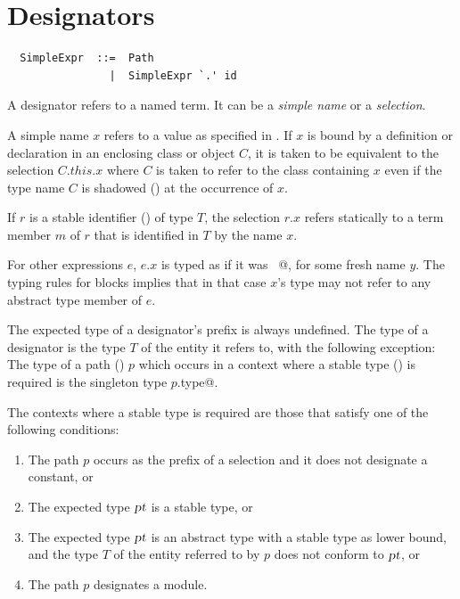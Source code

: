 \section{Designators}
\label{sec:designators}

\syntax\begin{lstlisting}
  SimpleExpr  ::=  Path
                |  SimpleExpr `.' id
\end{lstlisting}

A designator refers to a named term. It can be a {\em simple name} or
a {\em selection}. 

A simple name $x$ refers to a value as specified in .
If $x$ is bound by a definition or declaration in an enclosing class
or object $C$, it is taken to be equivalent to the selection
$C.this.x$ where $C$ is taken to refer to the class containing $x$
even if the type name $C$ is shadowed () at the
occurrence of $x$.

If $r$ is a stable identifier
() of type $T$, the selection $r.x$ refers
statically to a term member $m$ of $r$ that is identified in $T$ by
the name $x$.   

For other expressions $e$, $e.x$ is typed as
if it was ~@, for some fresh name
$y$.  The typing rules for blocks implies that in that case $x$'s type
may not refer to any abstract type member of $e$.

The expected type of a designator's prefix is always undefined.  The
type of a designator is the type $T$ of the entity it refers to, with the
following exception: The type of a path () $p$ which
occurs in a context where a stable type () is required is the
singleton type \lstinline@$p$.type@.

The contexts where a stable type is required are those that satisfy
one of the following conditions:
\begin{enumerate}
\item
The path $p$ occurs as the prefix of a selection and it does not
designate a constant, or
\item
The expected type $\mbox{\sl pt}$ is a stable type, or
\item
The expected type $\mbox{\sl pt}$ is an abstract type with a stable type as lower
bound, and the type $T$ of the entity referred to by $p$ does not
conform to $\mbox{\sl pt}$, or
\item
The path $p$ designates a module.
\end{enumerate}

